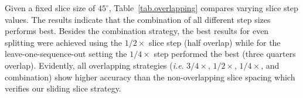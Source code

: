 \documentclass{tutmscthesis}[2010/09/22]
\numberwithin{equation}{section}
\numberwithin{table}{section}
\numberwithin{figure}{section}
\def\onedot{. }
\def\ie{\emph{i.e}\onedot} \def\Ie{\emph{I.e}\onedot}
\begin{document}
\vspace{\medskipamount} 
\begin{table}[th]
\caption{\label{tab.overlapping} Evaluation on the circular slice step size proportional to the $45^\circ$ slice size.}
\centering
{}
\end{table}
Given a fixed slice size of $45^\circ$,
Table~\ref{tab.overlapping} compares varying slice step values.
The results indicate that the combination of all different step sizes performs best.
Besides the combination strategy, the best results for even splitting were achieved using
the $1/2\times$ slice step (half overlap) while for
the leave-one-sequence-out setting the $1/4\times$ step
performed the best (three quarters overlap).
Evidently, all overlapping strategies (\ie $3/4\times$, $1/2\times$, $1/4\times$, and combination) show higher accuracy than the non-overlapping slice spacing which verifies our sliding slice strategy.
\end{document}
